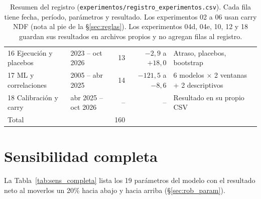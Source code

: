 \documentclass[10pt,a4paper]{article}
\begin{document}
\begin{table}[H]
\begin{tabular}{@{}llrrl@{}}
16 Ejecución y placebos   & 2023 -- oct 2026     & 13 & $-2{,}9$ a $+18{,}0$ & Atraso, placebos, bootstrap \\
17 ML y correlaciones     & 2005 -- abr 2025     & 14 & $-121{,}5$ a $-8{,}6$ & 6 modelos $\times$ 2 ventanas + 2 descriptivos \\
18 Calibración y carry    & abr 2025 -- oct 2026 & -- & -- & Resultado en su propio CSV \\
\midrule
Total                     &                      & 160 & & \\
\bottomrule
\end{tabular}
\caption{Resumen del registro (\texttt{experimentos/registro\_experimentos.csv}). Cada
fila tiene fecha, período, parámetros y resultado. Los experimentos 02 a 06 usan carry
NDF (nota al pie de la §\ref{sec:reglas}). Los experimentos 04d, 04e, 10, 12 y 18 guardan sus
resultados en archivos propios y no agregan filas al registro.}\label{tab:registro}
\end{table}

\clearpage
\section{Sensibilidad completa}\label{app:sensibilidad}

La Tabla~\ref{tab:sens_completa} lista los 19 parámetros del modelo con el resultado
neto al moverlos un 20\% hacia abajo y hacia arriba (§\ref{sec:rob_param}).
\end{document}

